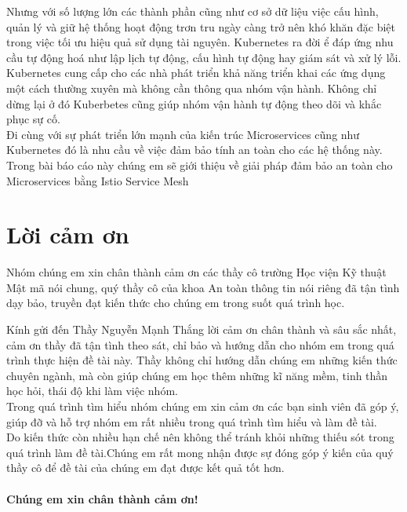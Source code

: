 \documentclass[12pt,a4paper]{report}
\begin{document}
Nhưng với số lượng lớn các thành phần cũng như cơ sở dữ liệu việc cấu hình, quản lý và giữ hệ thống hoạt động trơn tru ngày càng trở nên khó khăn đặc biệt trong việc tối ưu hiệu quả sử dụng tài nguyên. Kubernetes ra đời ể đáp ứng nhu cầu tự động hoá như lập lịch tự động, cấu hình tự động hay giám sát và xử lý lỗi.\\

Kubernetes cung cấp cho các nhà phát triển khả năng triển khai các ứng dụng một cách thường xuyên mà không cần thông qua nhóm vận hành. Không chỉ dừng lại ở đó Kuberbetes cũng giúp nhóm vận hành tự động theo dõi và khắc phục sự cố. \\

Đi cùng với sự phát triển lớn mạnh của kiến trúc Microservices cũng như Kubernetes đó là nhu cầu về việc đảm bảo tính an toàn cho các hệ thống này. Trong bài báo cáo này chúng em sẽ giới thiệu về giải pháp đảm bảo an toàn cho Microservices bằng Istio Service Mesh
	
\chapter*{\centering Lời cảm ơn}
\hspace{0.6cm}Nhóm chúng em xin chân thành cảm ơn các thầy cô trường Học viện Kỹ thuật Mật mã nói chung, quý thầy cô của khoa An toàn thông tin nói riêng đã tận tình dạy bảo, truyền đạt kiến thức cho chúng em trong suốt quá trình học.\newline

Kính gửi đến Thầy Nguyễn Mạnh Thắng lời cảm ơn chân thành và sâu sắc nhất, cảm ơn thầy đã tận tình theo sát, chỉ bảo và hướng dẫn cho nhóm em trong quá trình thực hiện đề tài này. Thầy không chỉ hướng dẫn chúng em những kiến thức chuyên ngành, mà còn giúp chúng em học thêm những kĩ năng mềm, tinh thần học hỏi, thái độ khi làm việc nhóm.\\

Trong quá trình tìm hiểu nhóm chúng em xin cảm ơn các bạn sinh viên đã góp ý, giúp đỡ và hỗ trợ nhóm em rất nhiều trong quá trình tìm hiểu và làm đề tài.\\

Do kiến thức còn nhiều hạn chế nên không thể tránh khỏi những thiếu sót trong quá trình làm đề tài.Chúng em rất mong nhận được sự đóng góp ý kiến của quý thầy cô để đề tài của chúng em đạt được kết quả tốt hơn.\\
\medskip \\
\textbf{Chúng em xin chân thành cảm ơn!}
\end{document}
